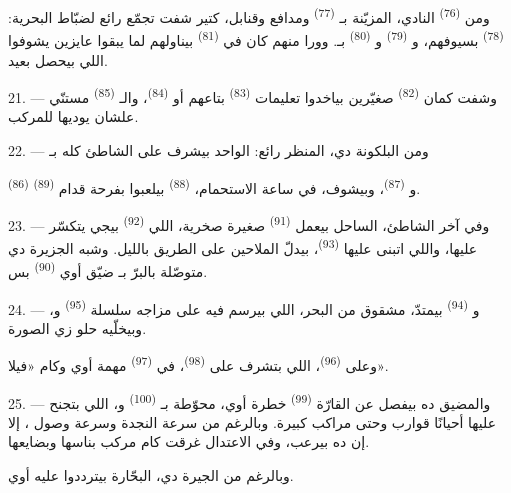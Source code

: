 ومن  \textsuperscript{(76)} النادي، المزيّنة بـ
\textsuperscript{(77)} ومدافع وقنابل، كتير شفت تجمّع رائع لضبّاط البحرية:
 \textsuperscript{(78)} بسيوفهم، و
\textsuperscript{(79)} و \textsuperscript{(80)} بـ.
وورا منهم كان في  \textsuperscript{(81)} بيناولهم  لما يبقوا عايزين يشوفوا اللي بيحصل بعيد.

21. --- وشفت كمان  \textsuperscript{(82)} صغيّرين بياخدوا
تعليمات  \textsuperscript{(83)} بتاعهم أو 
\textsuperscript{(84)}، والـ \textsuperscript{(85)} مستنّي علشان
يوديها للمركب.

22. --- ومن البلكونة دي، المنظر رائع: الواحد بيشرف على الشاطئ كله
بـ

\textsuperscript{(86)} و \textsuperscript{(87)}، وبيشوف، في ساعة
الاستحمام،  \textsuperscript{(88)} بيلعبوا بفرحة قدام
 \textsuperscript{(89)}.

23. --- وفي آخر الشاطئ، الساحل بيعمل  \textsuperscript{(91)} صغيرة
صخرية، اللي  \textsuperscript{(92)} بيجي يتكسّر عليها، واللي
اتبنى عليها  \textsuperscript{(93)}، بيدلّ الملاحين على الطريق بالليل.
وشبه الجزيرة دي متوصّلة بالبرّ بـ ضيّق أوي \textsuperscript{(90)} بس.

\VUsaut{3.0mm}
\VUsaut{3.0mm}

24. --- و \textsuperscript{(94)} بيمتدّ، مشقوق من البحر، اللي بيرسم فيه على
مزاجه سلسلة  \textsuperscript{(95)} و، وبيخلّيه حلو زي
الصورة.

وعلى  \textsuperscript{(96)}، اللي بتشرف على 
\textsuperscript{(98)}، في  \textsuperscript{(97)} مهمة أوي وكام «فيلا».

25. --- والمضيق ده بيفصل عن القارّة  \textsuperscript{(99)} خطرة أوي،
محوّطة بـ \textsuperscript{(100)} و، اللي بتجنح
عليها أحيانًا قوارب وحتى مراكب كبيرة. وبالرغم من سرعة النجدة وسرعة وصول
، إلا إن  ده بيرعب، وفي 
الاعتدال غرقت كام مركب بناسها وبضايعها.

وبالرغم من الجيرة دي،  البحّارة بيترددوا عليه أوي.

\VUsaut{6.0mm}
\VUfilet{22mm}
